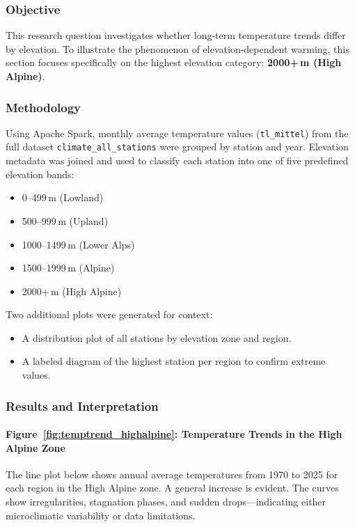 
\subsubsection{Objective}
This research question investigates whether long-term temperature trends differ by elevation. To illustrate the phenomenon of elevation-dependent warming, this section focuses specifically on the highest elevation category: \textbf{2000+\,m (High Alpine)}.

\subsubsection{Methodology}
Using Apache Spark, monthly average temperature values (\texttt{tl\_mittel}) from the full dataset \texttt{climate\_all\_stations} were grouped by station and year. Elevation metadata was joined and used to classify each station into one of five predefined elevation bands:
    \begin{itemize}
      \item 0--499\,m (Lowland)
      \item 500--999\,m (Upland)
      \item 1000--1499\,m (Lower Alps)
      \item 1500--1999\,m (Alpine)
      \item 2000+\,m (High Alpine)
    \end{itemize}
    
Two additional plots were generated for context:
\begin{itemize}
    \item A distribution plot of all stations by elevation zone and region.
    \item A labeled diagram of the highest station per region to confirm extreme values.
\end{itemize}

\subsubsection{Results and Interpretation}

\paragraph{Figure~\ref{fig:temptrend_highalpine}: Temperature Trends in the High Alpine Zone}
The line plot below shows annual average temperatures from 1970 to 2025 for each region in the High Alpine zone. A general increase is evident. The curves show irregularities, stagnation phases, and sudden drops—indicating either microclimatic variability or data limitations.

